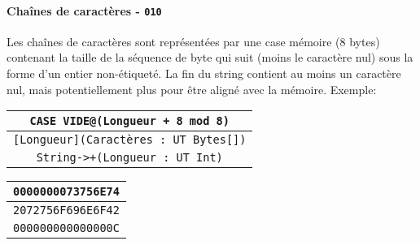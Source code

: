 \documentclass{article}
\begin{document}
\paragraph{Chaînes de caractères - \texttt{010}}
Les chaînes de caractères sont représentées par une case mémoire (8 bytes) contenant la taille de la séquence de byte qui suit (moins le caractère nul) sous la forme d'un entier non-étiqueté. La fin du string contient au moins un caractère nul, mais potentiellement plus pour être aligné avec la mémoire. Exemple:
\begin{center}
  \begin{tabular}{|c|}
    \hline
    \texttt{CASE VIDE@(Longueur + 8 mod 8)}\\
    \hline
    \texttt{[Longueur](Caractères : UT Bytes[])}\\
    \hline
    \texttt{String->+(Longueur : UT Int)}\\
    \hline
  \end{tabular}
  \hspace{2cm}
  \begin{tabular}{|c|}
    \hline
    \texttt{0000000073756E74}\\
    \hline
    \texttt{2072756F696E6F42}\\
    \hline
    \texttt{000000000000000C}\\
    \hline
  \end{tabular}
\end{center}
\end{document}
